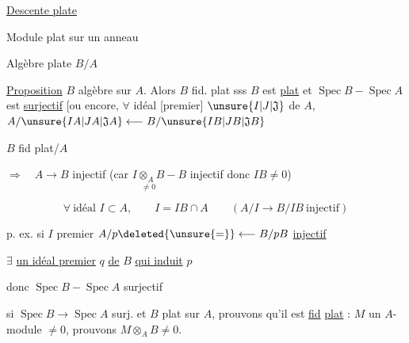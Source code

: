 
\uline{Descente plate}

Module plat sur un anneau 


Algèbre plate $B/A$

\uline{Proposition} $B$ algèbre sur $A$. Alors $B$ fid. plat sss $B$ est \uline{plat} et $\operatorname{Spec}B\mathrel{-}\operatorname{Spec}A$ est \uline{surjectif}  [ou encore, $\forall$ idéal [premier] $\unsure{I|J|\mathfrak J}$ de $A$, $A/\unsure{IA|JA|\mathfrak JA}\longleftarrow B/\unsure{IB|JB|\mathfrak JB}$


$B$ fid plat/$A$ 

$\Rightarrow\quad A\longrightarrow B$ injectif (car     $\underset{\ne0}{I\otimes_A B}\mathrel{-}B$ injectif donc $IB\ne0$)


\[
\forall\ \text{idéal } I\subset A,\qquad I=IB\cap A \qquad (A/I\longrightarrow B/IB\ \text{injectif})
\]

p. ex. si $I$ premier \quad $A/p\deleted{\unsure{=}}\longleftarrow B/pB$ \quad \uline{injectif}

  $\exists$ \uline{un idéal premier} $q$ \uline{de} $B$ \uline{qui induit} $p$

donc $\operatorname{Spec}B\mathrel{-}\operatorname{Spec}A$ surjectif

 si $\operatorname{Spec}B\longrightarrow\operatorname{Spec}A$ surj. et $B$ plat sur $A$, prouvons qu'il est \uline{fid} \uline{plat} : $M$ un $A$-module $\ne0$, prouvons $M\otimes_A B\ne0$.


